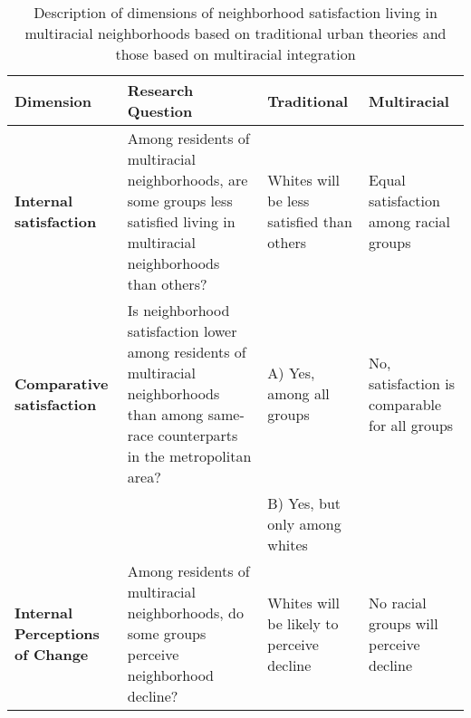 


\begin{sidewaystable}
\caption{Description of dimensions of neighborhood satisfaction living in multiracial neighborhoods based on traditional urban theories and those based on multiracial integration}
\label{tab:theory}
\begin{tabular}{L{2in}L{2in}L{2in}L{2in}}
\textbf{Dimension} & \textbf{Research Question} & \textbf{Traditional} & \textbf{Multiracial} \\\toprule
\textbf{Internal satisfaction} & Among residents of multiracial neighborhoods, are some groups less satisfied living in multiracial neighborhoods than others? & Whites will be less satisfied than others & Equal satisfaction among racial groups \\\midrule
\textbf{Comparative satisfaction} & Is neighborhood satisfaction lower among residents of multiracial neighborhoods than among same-race counterparts in the metropolitan area? & A) Yes, among all groups & No, satisfaction is comparable for all groups \\
&  & B) Yes, but only among whites & \\\midrule
\textbf{Internal Perceptions of Change} & Among residents of multiracial neighborhoods, do some groups perceive neighborhood decline? & Whites will be likely to perceive decline & No racial groups will perceive decline \\\bottomrule
\end{tabular}
\end{sidewaystable}

